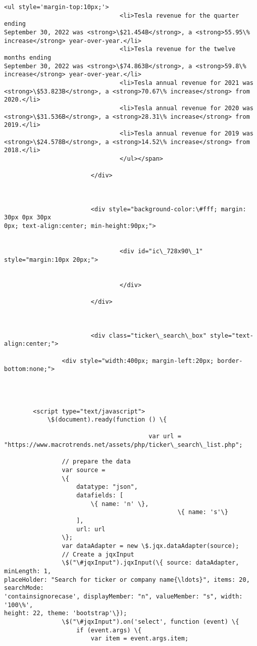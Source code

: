 \documentclass[11pt]{article}
\begin{document}
\begin{Verbatim}[commandchars=\\\{\}]
                                <ul style='margin-top:10px;'>
                                <li>Tesla revenue for the quarter ending
September 30, 2022 was <strong>\$21.454B</strong>, a <strong>55.95\%
increase</strong> year-over-year.</li>
                                <li>Tesla revenue for the twelve months ending
September 30, 2022 was <strong>\$74.863B</strong>, a <strong>59.8\%
increase</strong> year-over-year.</li>
                                <li>Tesla annual revenue for 2021 was
<strong>\$53.823B</strong>, a <strong>70.67\% increase</strong> from 2020.</li>
                                <li>Tesla annual revenue for 2020 was
<strong>\$31.536B</strong>, a <strong>28.31\% increase</strong> from 2019.</li>
                                <li>Tesla annual revenue for 2019 was
<strong>\$24.578B</strong>, a <strong>14.52\% increase</strong> from 2018.</li>
                                </ul></span>

                        </div>



                        <div style="background-color:\#fff; margin: 30px 0px 30px
0px; text-align:center; min-height:90px;">


                                <div id="ic\_728x90\_1" style="margin:10px 20px;">


                                </div>

                        </div>



                        <div class="ticker\_search\_box" style="text-
align:center;">

                <div style="width:400px; margin-left:20px; border-bottom:none;">




        <script type="text/javascript">
            \$(document).ready(function () \{

                                        var url =
"https://www.macrotrends.net/assets/php/ticker\_search\_list.php";

                // prepare the data
                var source =
                \{
                    datatype: "json",
                    datafields: [
                        \{ name: 'n' \},
                                                \{ name: 's'\}
                    ],
                    url: url
                \};
                var dataAdapter = new \$.jqx.dataAdapter(source);
                // Create a jqxInput
                \$("\#jqxInput").jqxInput(\{ source: dataAdapter, minLength: 1,
placeHolder: "Search for ticker or company name{\ldots}", items: 20, searchMode:
'containsignorecase', displayMember: "n", valueMember: "s", width: '100\%',
height: 22, theme: 'bootstrap'\});
                \$("\#jqxInput").on('select', function (event) \{
                    if (event.args) \{
                        var item = event.args.item;


\end{Verbatim}
\end{document}
